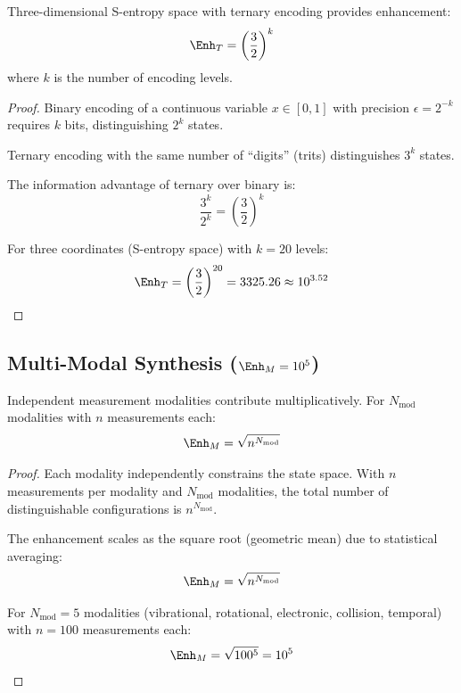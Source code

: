 \begin{theorem}
\label{thm:ternary}
Three-dimensional S-entropy space with ternary encoding provides enhancement:
\begin{equation}
\Enh_T = \left(\frac{3}{2}\right)^k
\end{equation}
where $k$ is the number of encoding levels.
\end{theorem}

\begin{proof}
Binary encoding of a continuous variable $x \in [0,1]$ with precision $\epsilon = 2^{-k}$ requires $k$ bits, distinguishing $2^k$ states.

Ternary encoding with the same number of ``digits'' (trits) distinguishes $3^k$ states.

The information advantage of ternary over binary is:
\begin{equation}
\frac{3^k}{2^k} = \left(\frac{3}{2}\right)^k
\end{equation}

For three coordinates (S-entropy space) with $k = 20$ levels:
\begin{equation}
\Enh_T = \left(\frac{3}{2}\right)^{20} = 3325.26 \approx 10^{3.52}
\end{equation}
\end{proof}

\subsection{Multi-Modal Synthesis ($\Enh_M = 10^{5}$)}

\begin{theorem}
\label{thm:multimodal}
Independent measurement modalities contribute multiplicatively. For $N_{\text{mod}}$ modalities with $n$ measurements each:
\begin{equation}
\Enh_M = \sqrt{n^{N_{\text{mod}}}}
\end{equation}
\end{theorem}

\begin{proof}
Each modality independently constrains the state space. With $n$ measurements per modality and $N_{\text{mod}}$ modalities, the total number of distinguishable configurations is $n^{N_{\text{mod}}}$.

The enhancement scales as the square root (geometric mean) due to statistical averaging:
\begin{equation}
\Enh_M = \sqrt{n^{N_{\text{mod}}}}
\end{equation}

For $N_{\text{mod}} = 5$ modalities (vibrational, rotational, electronic, collision, temporal) with $n = 100$ measurements each:
\begin{equation}
\Enh_M = \sqrt{100^5} = 10^5
\end{equation}
\end{proof}

